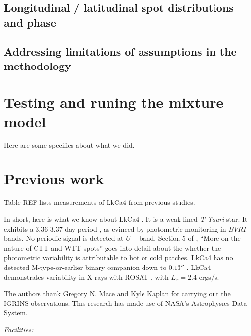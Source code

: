 \documentclass[onecolumn]{emulateapj}%
\newcommand{\name}{LkCa4 }
\begin{document}
\subsection{Longitudinal / latitudinal spot distributions and phase}

\subsection{Addressing limitations of assumptions in the methodology}



\appendix

\section{Testing and runing the mixture model}

Here are some specifics about what we did.

\section{Previous work}

Table REF lists measurements of LkCa4 from previous studies.


In short, here is what we know about \name.  It is a weak-lined \emph{T-Tauri} star.  It exhibits a 3.36-3.37 day period \citep{1993AJ....106.1608V,1994IBVS.4042....1G}, as evinced by photometric monitoring in $BVRI$ bands.  No periodic signal is detected at $U-$band.  Section 5 of \citet{1993AJ....106.1608V}, ``More on the nature of CTT and WTT spots'' goes into detail about the whether the photometric variability is attributable to hot or cold patches.  \name has no detected M-type-or-earlier binary companion down to $0.13''$ \citep{1993A&A...278..129L}.  \name demonstrates variability in X-rays with ROSAT \citep{1994ApJ...424..237S}, with $L_{x}=2.4$ ergs/s.


\acknowledgements
The authors thank Gregory N. Mace and Kyle Kaplan for carrying out the IGRINS observations. This research has made use of NASA's Astrophysics Data System.

{\it Facilities:} 

\clearpage



\end{document}

